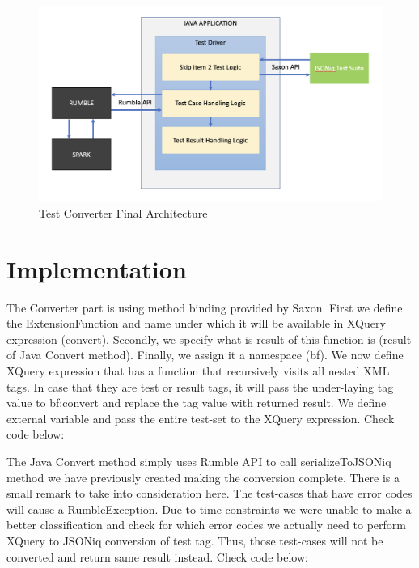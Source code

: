 \begin{figure}[h!]
	\vspace*{-5mm}
	\includegraphics[width=\linewidth]{test_driver_final_architecture.png}
	\vspace*{-10mm}
	\caption{Test Converter Final Architecture}
	\label{fig:test_driver_final_architecture.png}
\end{figure}

\section{Implementation}
The Converter part is using method binding provided by Saxon. First we define the ExtensionFunction and name under which it will be available in XQuery expression (convert). Secondly, we specify what is result of this function is (result of Java Convert method). Finally, we assign it a namespace (bf). We now define XQuery expression that has a function that recursively visits all nested XML tags. In case that they are test or result tags, it will pass the under-laying tag value to bf:convert and replace the tag value with returned result. We define external variable and pass the entire test-set to the XQuery expression. Check code below:



The Java Convert method simply uses Rumble API to call serializeToJSONiq method we have previously created making the conversion complete. There is a small remark to take into consideration here. The test-cases that have error codes will cause a RumbleException. Due to time constraints we were unable to make a better classification and check for which error codes we actually need to perform XQuery to JSONiq conversion of test tag. Thus, those test-cases will not be converted and return same result instead. Check code below:

